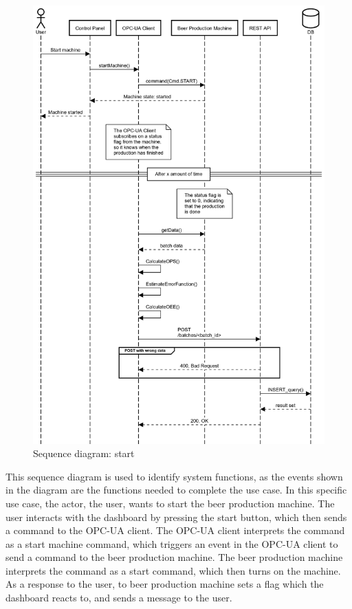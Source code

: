 \begin{figure}[H]
\centering 
\includegraphics[scale=0.31]{images/sequence_operation/start.png}
\caption{Sequence diagram: start}
\label{figure:sequence_diagram} 
\end{figure}

This sequence diagram is used to identify system functions, as the events shown
in the diagram are the functions needed to complete the use case. In this
specific use case, the actor, the user, wants to start the beer production
machine. The user interacts with the dashboard by pressing the start button,
which then sends a command to the OPC-UA client. The OPC-UA client interprets
the command as a start machine command, which triggers an event in the OPC-UA
client to send a command to the beer production machine. The beer production
machine interprets the command as a start command, which then turns on the 
machine. As a response to the user, to beer production machine sets a flag
which the dashboard reacts to, and sends a message to the user. \\

